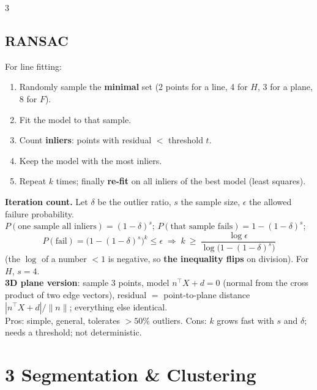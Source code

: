 \documentclass[9pt,a4paper,landscape]{extarticle}
\newcommand{\key}[1]{\textbf{#1}}
\begin{document}
\begin{multicols}{3}
\subsection{RANSAC}
For line fitting:
\begin{enumerate}
\item Randomly sample the \key{minimal} set (2 points for a line, 4 for $H$, 3 for a plane, 8 for $F$).
\item Fit the model to that sample.
\item Count \key{inliers}: points with residual $<$ threshold $t$.
\item Keep the model with the most inliers.
\item Repeat $k$ times; finally \key{re-fit} on all inliers of the best model (least squares).
\end{enumerate}
\key{Iteration count.} Let $\delta$ be the outlier ratio, $s$ the sample size, $\epsilon$ the allowed failure probability.\\
$P(\text{one sample all inliers})=(1-\delta)^s$; $P(\text{that sample fails})=1-(1-\delta)^s$;
$$P(\text{fail})=\big(1-(1-\delta)^s\big)^k\le\epsilon \;\Rightarrow\; k\ \ge\ \frac{\log\epsilon}{\log\big(1-(1-\delta)^{s}\big)}$$
(the $\log$ of a number $<1$ is negative, so \key{the inequality flips} on division). For $H$, $s=4$.\\
\key{3D plane version}: sample 3 points, model $n^\top X+d=0$ (normal from the cross product of two edge vectors), residual $=$ point-to-plane distance $|n^\top X+d|/\|n\|$; everything else identical.\\
Pros: simple, general, tolerates $>50\%$ outliers. Cons: $k$ grows fast with $s$ and $\delta$; needs a threshold; not deterministic.

\section{3 \; Segmentation \& Clustering}


\end{multicols}
\end{document}
